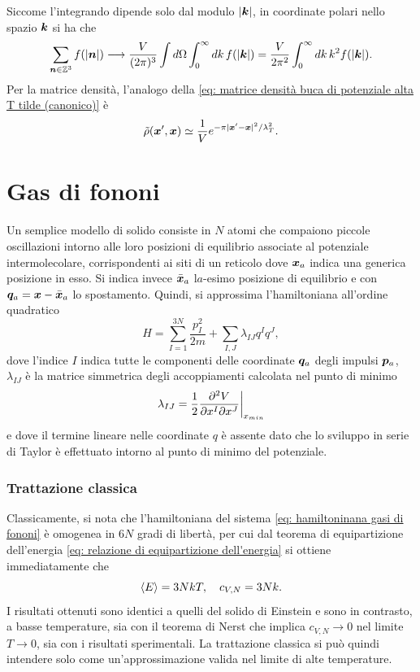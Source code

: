 Siccome l'integrando dipende solo dal modulo $|\bm{k}|$, in coordinate polari nello spazio $\bm{k}$ si ha che 
\begin{equation}
    \sum_{\bm{n}\in\mathbb{Z}^3} f(|\bm{n}|) \longrightarrow \frac{V}{(2\pi)^3}\int d\Omega \int_0^\infty dk\, f(|\bm{k}|) = \frac{V}{2\pi^2} \int_0^\infty dk\, k^2 f(|\bm{k}|).
\end{equation}
Per la matrice densità, l'analogo della \eqref{eq: matrice densità buca di potenziale alta T tilde (canonico)} è
\begin{equation}
    \tilde{\rho}(\bm{x}',\bm{x}) \simeq \frac{1}{V} e^{-\pi|\bm{x}'-\bm{x}|^2 / \lambda_T^2}.
\end{equation}

\section{Gas di fononi}
Un semplice modello di solido consiste in $N$ atomi che compaiono piccole oscillazioni intorno alle loro posizioni di equilibrio associate al potenziale intermolecolare, corrispondenti ai siti di un reticolo dove $\bm{x}_a$ indica una generica posizione in esso. Si indica invece $\bar{\bm{x}}_a$ l$a$-esimo posizione di equilibrio e con $\bm{q}_a = \bm{x} - \bar{\bm{x}}_a$ lo spostamento. Quindi, si approssima l'hamiltoniana all'ordine quadratico 
\begin{equation}
\label{eq: hamiltoninana gasi di fononi}
    H = \sum_{I=1}^{3N}\frac{p_I^2}{2m} + \sum_{I,J}\lambda_{IJ}q^Iq^J,
\end{equation}
dove l'indice $I$ indica tutte le componenti delle coordinate $\bm{q}_a$ degli impulsi $\bm{p}_a$, $\lambda_{IJ}$ è la matrice simmetrica degli accoppiamenti calcolata nel punto di minimo
\begin{equation}
    \lambda_{IJ} = \frac{1}{2}\frac{\partial^2V}{\partial x^I\partial x^J}\bigg|_{x_{min}}
\end{equation}
e dove il termine lineare nelle coordinate $q$ è assente dato che lo sviluppo in serie di Taylor è effettuato intorno al punto di minimo del potenziale.

\subsubsection{Trattazione classica}
Classicamente, si nota che l'hamiltoniana del sistema \eqref{eq: hamiltoninana gasi di fononi} è omogenea in $6N$ gradi di libertà, per cui dal teorema di equipartizione dell'energia \eqref{eq: relazione di equipartizione dell'energia} si ottiene immediatamente che
\begin{equation}
    \langle E \rangle = 3NkT,\quad c_{V,N} = 3Nk.
\end{equation}
I risultati ottenuti sono identici a quelli del solido di Einstein e sono in contrasto, a basse temperature, sia con il teorema di Nerst che implica $c_{V,N} \to 0$ nel limite $T \to 0$, sia con i risultati sperimentali. La trattazione classica si può quindi intendere solo come un'approssimazione valida nel limite di alte temperature.

